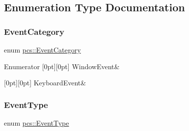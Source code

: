 \subsection{Enumeration Type Documentation}
\mbox{\label{namespacepcs_a3538ef524602fc09ddb40acc72480c60}} 
\subsubsection{\texorpdfstring{Event\+Category}{EventCategory}}
{\footnotesize\ttfamily enum \hyperlink{namespacepcs_a3538ef524602fc09ddb40acc72480c60}{pcs\+::\+Event\+Category}}

\begin{DoxyEnumFields}{Enumerator}
[0pt][0pt]{}\mbox{\label{namespacepcs_a3538ef524602fc09ddb40acc72480c60a5fb31ca24b241c5c6af3df6930ef53ba}} 
Window\+Event&\\
\hline

[0pt][0pt]{}\mbox{\label{namespacepcs_a3538ef524602fc09ddb40acc72480c60a26cd4d5fcc5bb943efa4fd4ce0a69386}} 
Keyboard\+Event&\\
\hline

\end{DoxyEnumFields}
\mbox{\label{namespacepcs_a12954f53e3d7d6a8765fd723e1ce8db4}} 
\subsubsection{\texorpdfstring{Event\+Type}{EventType}}
{\footnotesize\ttfamily enum \hyperlink{namespacepcs_a12954f53e3d7d6a8765fd723e1ce8db4}{pcs\+::\+Event\+Type}\hspace{0.3cm}{\ttfamily [strong]}}

